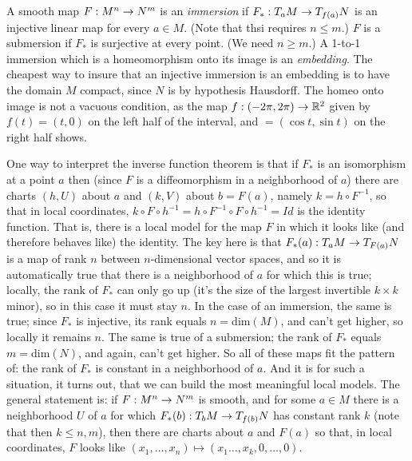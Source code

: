 A smooth map $F:M^n\rightarrow N^m$ is an {\it immersion} if $F_*:T_aM\rightarrow T_{f(a)}N$
is an injective linear map for every $a\in M$. (Note that thsi requires $n\leq m$.)
$F$ is a submersion if $F_*$ is surjective at every point. (We need $n\geq m$.)
A 1-to-1 immersion which is a homeomorphism onto its image is an {\it embedding}.
The cheapest way to insure that an injective immersion is an embedding is to 
have the domain $M$ compact, since $N$ is by hypothesis Hausdorff. The homeo
onto image is not a vacuous condition, as the map $f:(-2\pi,2\pi)\rightarrow {\Bbb R}^2$ given by
$f(t)=(t,0)$ on the left half of the interval, and $=(\cos t,\sin t)$ on the right half shows.

\ssk

One way to interpret the inverse function theorem is that if $F_*$ is an isomorphism 
at a point $a$ then (since $F$ is a diffeomorphism in a neighborhood of $a$) there
are charts $(h,U)$ about $a$ and $(k,V)$ about $b=F(a)$, namely $k=h\circ F^{-1}$,
so that in local coordinates, $k\circ F\circ h^{-1}=
h\circ F^{-1}\circ F\circ h^{-1}=Id$ is the identity function. That is, there is a 
local model for the map $F$ in which it looks like (and therefore behaves like)
the identity. The key here is that $F_*(a):T_aM\rightarrow T_{F(a)}N$ is a map of rank $n$
between $n$-dimensional vector spaces, and so it is automatically true that there
is a neighborhood of $a$ for which this is true; locally, the rank of $F_*$ can only go up
(it's the size of the largest invertible $k\times k$ minor), so in this case it must stay
$n$. In the case of an immersion, the same is true; since $F_*$ is injective, its rank
equals $n=$dim$(M)$, and can't get higher, so locally it remains $n$. The same is true 
of a submersion; the rank of $F_*$ equals $m=$dim$(N)$, and again, can't get higher.
So all of these maps fit the pattern of: the rank of $F_*$ is constant in a neighborhood
of $a$. And it is for such a situation, it turns out, that we can build the most 
meaningful local models. The general statement is: if $F:M^n\rightarrow N^m$ is smooth, and for 
some $a\in M$ there is a neighborhood $U$ of $a$ for which $F_*(b):T_bM\rightarrow T_{f(b)}N$ has 
constant rank $k$ (note that then $k\leq n,m$), then there are charts about 
$a$ and $F(a)$ so that, in local
coordinates, $F$ looks like $(x_1,\ldots ,x_n)\mapsto (x_1\ldots ,x_k,0,\ldots ,0)$.

